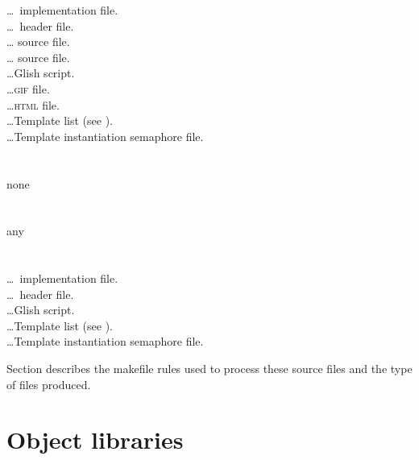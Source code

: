 \begin{tabbing}
                    \>\ldots \cplusplus\ implementation file.\\
                     \>\ldots \cplusplus\ header file.\\
                     \>\ldots {} source file.\\
                     \>\ldots {} source file.\\
                     \>\ldots Glish script.\\
                   \>\ldots \textsc{gif} file.\\
                  \>\ldots \textsc{html} file.\\
              \>\ldots Template list (see ).\\
        \>\ldots Template instantiation semaphore file.\\
\-\\
   \+\\
      none\\
\-\\
   \+\\
      any\\
\-\\
   \+\\
                    \>\ldots \cplusplus\ implementation file.\\
                     \>\ldots \cplusplus\ header file.\\
                     \>\ldots Glish script.\\
              \>\ldots Template list (see ).\\
        \>\ldots Template instantiation semaphore file.
\end{tabbing}

\noindent
Section  describes the makefile rules
used to process these source files and the type of files produced.


\newpage
\section{Object libraries}
\label{Object libraries}


